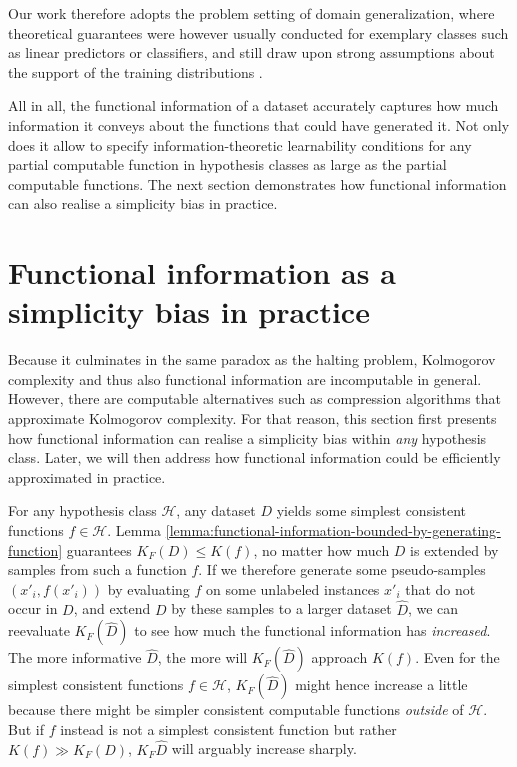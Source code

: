 Our work therefore adopts the problem setting of domain generalization, where theoretical guarantees were however usually conducted for exemplary classes such as linear predictors or classifiers, and still draw upon strong assumptions about the support of the training distributions \cite{arjovsky2019invariant,ahuja2021invariance}.


All in all, the functional information of a dataset accurately captures how much information it conveys about the functions that could have generated it.
Not only does it allow to specify information-theoretic learnability conditions for any partial computable function in hypothesis classes as large as the partial computable functions.
The next section demonstrates how functional information can also realise a simplicity bias in practice.

\section{Functional information as a simplicity bias in practice}
\label{sec:functional-inforamtion-simplicity-bias}
Because it culminates in the same paradox as the halting problem, Kolmogorov complexity and thus also functional information are incomputable in general.
However, there are computable alternatives such as compression algorithms that approximate Kolmogorov complexity.
For that reason, this section first presents how functional information can realise a simplicity bias within \textit{any} hypothesis class.
Later, we will then address how functional information could be efficiently approximated in practice.

For any hypothesis class $\mathcal{H}$, any dataset $D$ yields some simplest consistent functions $f\in\mathcal{H}$.
Lemma \ref{lemma:functional-information-bounded-by-generating-function} guarantees $K_F(D)\leq K(f)$, no matter how much $D$ is extended by samples from such a function $f$.
If we therefore generate some pseudo-samples $(x'_i,f(x'_i))$ by evaluating $f$ on some unlabeled instances $x'_i$ that do not occur in $D$, and extend $D$ by these samples to a larger dataset $\hat{D}$, we can reevaluate $K_F(\hat{D})$ to see how much the functional information has \textit{increased}. 
The more informative $\hat{D}$, the more will $K_F(\hat{D})$ approach $K(f)$.
Even for the simplest consistent functions $f\in\mathcal{H}$, $K_F(\hat{D})$ might hence increase a little because there might be simpler consistent computable functions \textit{outside} of $\mathcal{H}$.
But if $f$ instead is not a simplest consistent function but rather $K(f)\gg K_F(D)$, $K_F{\hat{D}}$ will arguably increase sharply.

